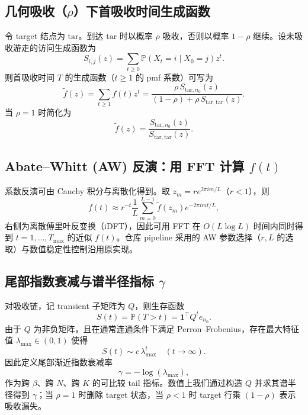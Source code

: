 \subsection{几何吸收（\texorpdfstring{$\rho$}{rho}）下首吸收时间生成函数}
令 target 结点为 $\mathrm{tar}$。到达 $\mathrm{tar}$ 时以概率 $\rho$ 吸收，否则以概率 $1-\rho$ 继续。设未吸收游走的访问生成函数为
\[
S_{i,j}(z)=\sum_{t\ge 0}\mathbb{P}(X_t=i\mid X_0=j)z^t.
\]
则首吸收时间 $T$ 的生成函数（$t\ge 1$ 的 pmf 系数）可写为
\begin{equation}
\tilde f(z)=\sum_{t\ge 1}f(t)z^t
=\frac{\rho\,S_{\mathrm{tar},n_0}(z)}{(1-\rho)+\rho\,S_{\mathrm{tar},\mathrm{tar}}(z)}.
\end{equation}
当 $\rho=1$ 时简化为
\[
\tilde f(z)=\frac{S_{\mathrm{tar},n_0}(z)}{S_{\mathrm{tar},\mathrm{tar}}(z)}.
\]

\subsection{Abate--Whitt (AW) 反演：用 FFT 计算 \texorpdfstring{$f(t)$}{f(t)}}
系数反演可由 Cauchy 积分与离散化得到。取 $z_m=re^{2\pi i m/L}$（$r<1$），则
\begin{equation}
f(t)\approx r^{-t}\frac{1}{L}\sum_{m=0}^{L-1}\tilde f(z_m)e^{-2\pi i mt/L},
\end{equation}
右侧为离散傅里叶反变换（iDFT），因此可用 FFT 在 $O(L\log L)$ 时间内同时得到 $t=1,\dots,T_{\max}$ 的近似 $f(t)$。仓库 pipeline 采用的 AW 参数选择（$r,L$ 的选取）与数值稳定性控制沿用原实现。

\subsection{尾部指数衰减与谱半径指标 \texorpdfstring{$\gamma$}{gamma}}
对吸收链，记 transient 子矩阵为 $Q$，则生存函数
\[
S(t)=\mathbb{P}(T>t)=\mathbf{1}^\top Q^t e_{n_0}.
\]
由于 $Q$ 为非负矩阵，且在通常连通条件下满足 Perron--Frobenius，存在最大特征值 $\lambda_{\max}\in(0,1)$ 使得
\[
S(t)\sim c\,\lambda_{\max}^t\quad (t\to\infty).
\]
因此定义尾部渐近指数衰减率
\begin{equation}
\gamma=-\log(\lambda_{\max}),
\end{equation}
作为跨 $\beta$、跨 $N$、跨 $K$ 的可比较 tail 指标。数值上我们通过构造 $Q$ 并求其谱半径得到 $\gamma$；当 $\rho=1$ 时删除 target 状态，当 $\rho<1$ 时 target 行乘 $(1-\rho)$ 表示吸收漏失。
